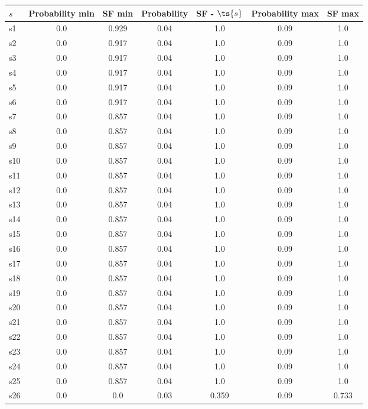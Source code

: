 \documentclass{article}
\begin{document}
\noindent\begin{tabular}{|l|c|c|c|c|c|c|}
\hline
$s$& Probability min & SF min & Probability & SF - $\ts{s}$ & Probability max & SF max\\
\hline
s1 &0.0 & 0.929 & 0.04 & 1.0 & 0.09 & 1.0\\
\hline
s2 &0.0 & 0.917 & 0.04 & 1.0 & 0.09 & 1.0\\
\hline
s3 &0.0 & 0.917 & 0.04 & 1.0 & 0.09 & 1.0\\
\hline
s4 &0.0 & 0.917 & 0.04 & 1.0 & 0.09 & 1.0\\
\hline
s5 &0.0 & 0.917 & 0.04 & 1.0 & 0.09 & 1.0\\
\hline
s6 &0.0 & 0.917 & 0.04 & 1.0 & 0.09 & 1.0\\
\hline
s7 &0.0 & 0.857 & 0.04 & 1.0 & 0.09 & 1.0\\
\hline
s8 &0.0 & 0.857 & 0.04 & 1.0 & 0.09 & 1.0\\
\hline
s9 &0.0 & 0.857 & 0.04 & 1.0 & 0.09 & 1.0\\
\hline
s10 &0.0 & 0.857 & 0.04 & 1.0 & 0.09 & 1.0\\
\hline
s11 &0.0 & 0.857 & 0.04 & 1.0 & 0.09 & 1.0\\
\hline
s12 &0.0 & 0.857 & 0.04 & 1.0 & 0.09 & 1.0\\
\hline
s13 &0.0 & 0.857 & 0.04 & 1.0 & 0.09 & 1.0\\
\hline
s14 &0.0 & 0.857 & 0.04 & 1.0 & 0.09 & 1.0\\
\hline
s15 &0.0 & 0.857 & 0.04 & 1.0 & 0.09 & 1.0\\
\hline
s16 &0.0 & 0.857 & 0.04 & 1.0 & 0.09 & 1.0\\
\hline
s17 &0.0 & 0.857 & 0.04 & 1.0 & 0.09 & 1.0\\
\hline
s18 &0.0 & 0.857 & 0.04 & 1.0 & 0.09 & 1.0\\
\hline
s19 &0.0 & 0.857 & 0.04 & 1.0 & 0.09 & 1.0\\
\hline
s20 &0.0 & 0.857 & 0.04 & 1.0 & 0.09 & 1.0\\
\hline
s21 &0.0 & 0.857 & 0.04 & 1.0 & 0.09 & 1.0\\
\hline
s22 &0.0 & 0.857 & 0.04 & 1.0 & 0.09 & 1.0\\
\hline
s23 &0.0 & 0.857 & 0.04 & 1.0 & 0.09 & 1.0\\
\hline
s24 &0.0 & 0.857 & 0.04 & 1.0 & 0.09 & 1.0\\
\hline
s25 &0.0 & 0.857 & 0.04 & 1.0 & 0.09 & 1.0\\
\hline
s26 &0.0 & 0.0 & 0.03 & 0.359 & 0.09 & 0.733\\

\end{tabular}
\end{document}
